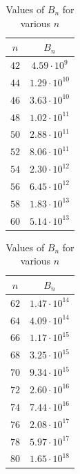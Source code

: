 \documentclass[11pt]{llncs}
\begin{document}
\begin{table}
\begin{minipage}{0.24\textwidth}
        \centering
        \begin{tabular}{|c|c|}
            \hline
            $n$ & $B_n$ \\
            \hline
            $42$ & $4.59 \cdot 10^{9}$  \\
            $44$ & $1.29 \cdot 10^{10}$ \\
            $46$ & $3.63 \cdot 10^{10}$ \\
            $48$ & $1.02 \cdot 10^{11}$ \\
            $50$ & $2.88 \cdot 10^{11}$ \\
            $52$ & $8.06 \cdot 10^{11}$ \\
            $54$ & $2.30 \cdot 10^{12}$ \\
            $56$ & $6.45 \cdot 10^{12}$ \\
            $58$ & $1.83 \cdot 10^{13}$ \\
            $60$ & $5.14 \cdot 10^{13}$ \\
            \hline
        \end{tabular}
    \end{minipage}%
    \begin{minipage}{0.24\textwidth}
        \centering
        \begin{tabular}{|c|c|}
            \hline
            $n$ & $B_n$ \\
            \hline
            $62$ & $1.47 \cdot 10^{14}$ \\
            $64$ & $4.09 \cdot 10^{14}$ \\
            $66$ & $1.17 \cdot 10^{15}$ \\
            $68$ & $3.25 \cdot 10^{15}$ \\
            $70$ & $9.34 \cdot 10^{15}$ \\
            $72$ & $2.60 \cdot 10^{16}$ \\
            $74$ & $7.44 \cdot 10^{16}$ \\
            $76$ & $2.08 \cdot 10^{17}$ \\
            $78$ & $5.97 \cdot 10^{17}$ \\
            $80$ & $1.65 \cdot 10^{18}$ \\
            \hline
        \end{tabular}
    \end{minipage}
    \caption{Values of $B_n$ for various $n$}
    \label{table:walsh_bounds}
\end{table}
\end{document}
